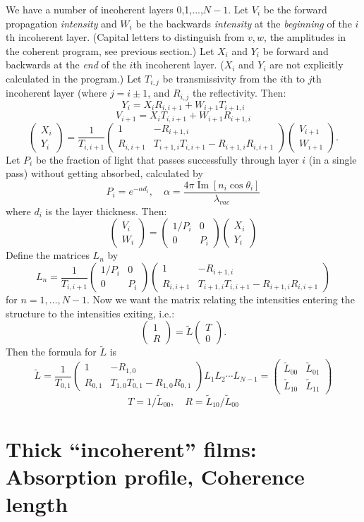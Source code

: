 \documentclass[12pt]{article}
\newcommand{\smat}{\left( \begin{matrix}} %
\newcommand{\emat}{\end{matrix} \right)} %
\renewcommand{\(}{\left(}
\renewcommand{\)}{\right)}
\renewcommand{\Im}{\operatorname{Im}}
\begin{document}
We have a number of incoherent layers 0,1,...,$N-1$. Let $V_i$ be the forward propagation \emph{intensity} and $W_i$ be the backwards \emph{intensity} at the \emph{beginning} of the $i$th incoherent layer. (Capital letters to distinguish from $v,w$, the amplitudes in the coherent program, see previous section.) Let $X_i$ and $Y_i$ be forward and backwards at the \emph{end} of the $i$th incoherent layer. ($X_i$ and $Y_i$ are not explicitly calculated in the program.) Let $T_{i,j}$ be transmissivity from the $i$th to $j$th incoherent layer (where $j=i\pm 1$, and $R_{i,j}$ the reflectivity. Then:
$$Y_i = X_i R_{i,i+1} + W_{i+1} T_{i+1,i}$$
$$V_{i+1} = X_i T_{i,i+1} + W_{i+1} R_{i+1,i}$$
$$\smat X_i \\ Y_i \emat = \frac{1}{T_{i,i+1}} \smat 1 & -R_{i+1,i} \\  R_{i,i+1} & T_{i+1,i}T_{i,i+1} -  R_{i+1,i}R_{i,i+1} \emat \smat V_{i+1} \\ W_{i+1} \emat.$$
Let $P_i$ be the fraction of light that passes successfully through layer $i$ (in a single pass) without getting absorbed, calculated by
$$P_i = e^{-\alpha d_i}, \quad \alpha = \frac{4\pi \Im[n_i \cos \theta_i]}{\lambda_{vac}}$$
where $d_i$ is the layer thickness. Then:
$$\smat V_i \\ W_i \emat = \smat 1/P_i & 0 \\ 0 & P_i \emat \smat X_i \\ Y_i \emat$$
Define the matrices $L_n$ by
$$L_n =  \frac{1}{T_{i,i+1}} \smat 1/P_i & 0 \\ 0 & P_i \emat \smat 1 & -R_{i+1,i} \\  R_{i,i+1} & T_{i+1,i}T_{i,i+1} -  R_{i+1,i}R_{i,i+1} \emat$$
for $n=1,\ldots,N-1$. Now we want the matrix relating the intensities  entering the structure to the intensities exiting, i.e.:
$$\smat 1 \\ R \emat = \tilde{L} \smat T \\ 0 \emat.$$
Then the formula for $\tilde{L}$ is
$$\tilde{L} = \frac{1}{T_{0,1}} \smat 1 & -R_{1,0} \\  R_{0,1} & T_{1,0}T_{0,1} -  R_{1,0}R_{0,1} \emat L_1 L_2 \cdots L_{N-1} = \smat \tilde{L}_{00} & \tilde{L}_{01} \\ \tilde{L}_{10} & \tilde{L}_{11} \emat$$
$$T = 1/\tilde{L}_{00}, \quad R = \tilde{L}_{10}/\tilde{L}_{00}$$

\section{Thick ``incoherent'' films: Absorption profile, Coherence length}
\end{document}
